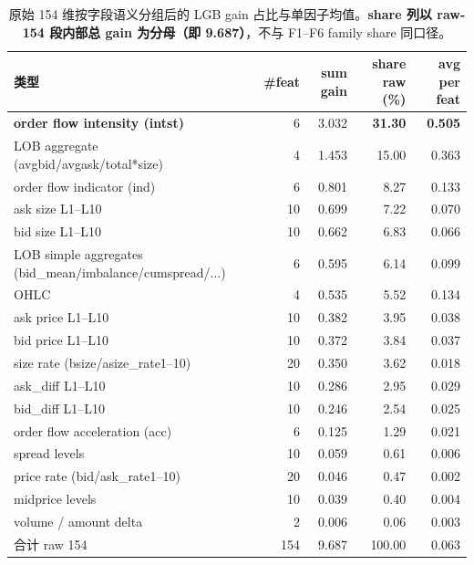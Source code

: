 \documentclass[10.5pt,a4paper]{article}
\begin{document}
\begin{table}[H]
\centering\small
\begin{tabular}{l r r r r}
\toprule
类型 & \#feat & sum gain & share raw (\%) & avg per feat \\
\midrule
\textbf{order flow intensity (intst)}     &  6 & 3.032 & \textbf{31.30} & \textbf{0.505} \\
LOB aggregate (avgbid/avgask/total*size)  &  4 & 1.453 & 15.00 & 0.363 \\
order flow indicator (ind)                &  6 & 0.801 &  8.27 & 0.133 \\
ask size L1–L10                           & 10 & 0.699 &  7.22 & 0.070 \\
bid size L1–L10                           & 10 & 0.662 &  6.83 & 0.066 \\
LOB simple aggregates (bid\_mean/imbalance/cumspread/...) &  6 & 0.595 &  6.14 & 0.099 \\
OHLC                                      &  4 & 0.535 &  5.52 & 0.134 \\
ask price L1–L10                          & 10 & 0.382 &  3.95 & 0.038 \\
bid price L1–L10                          & 10 & 0.372 &  3.84 & 0.037 \\
size rate (bsize/asize\_rate1–10)         & 20 & 0.350 &  3.62 & 0.018 \\
ask\_diff L1–L10                          & 10 & 0.286 &  2.95 & 0.029 \\
bid\_diff L1–L10                          & 10 & 0.246 &  2.54 & 0.025 \\
order flow acceleration (acc)             &  6 & 0.125 &  1.29 & 0.021 \\
spread levels                             & 10 & 0.059 &  0.61 & 0.006 \\
price rate (bid/ask\_rate1–10)            & 20 & 0.046 &  0.47 & 0.002 \\
midprice levels                           & 10 & 0.039 &  0.40 & 0.004 \\
volume / amount delta                     &  2 & 0.006 &  0.06 & 0.003 \\
\midrule
合计 raw 154                              & 154 & 9.687 & 100.00 & 0.063 \\
\bottomrule
\end{tabular}
\caption{原始 154 维按字段语义分组后的 LGB gain 占比与单因子均值。\textbf{share 列以 raw-154 段内部总 gain 为分母（即 9.687）}，不与 F1--F6 family share 同口径。}
\label{tab:raw-cat}
\end{table}
\end{document}
